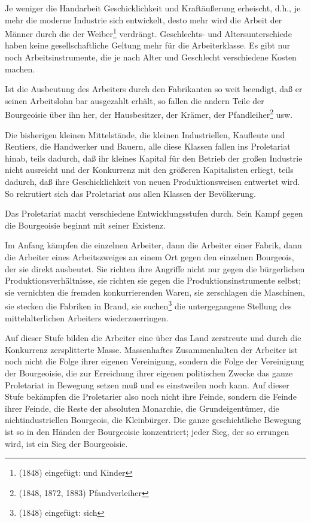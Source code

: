 \documentclass[letterpaper]{article}
\begin{document}
Je weniger die Handarbeit Geschicklichkeit und Kraftäußerung erheischt, d.h., je mehr die moderne Industrie sich entwickelt, desto mehr wird die Arbeit der Männer durch die der Weiber\footnote{(1848) eingefügt: und Kinder} verdrängt. Geschlechts- und Altersunterschiede haben keine gesellschaftliche Geltung mehr für die Arbeiterklasse. Es gibt nur noch Arbeitsinstrumente, die je nach Alter und Geschlecht verschiedene Kosten machen.

Ist die Ausbeutung des Arbeiters durch den Fabrikanten so weit beendigt, daß er seinen Arbeitslohn bar ausgezahlt erhält, so fallen die andern Teile der Bourgeoisie über ihn her, der Hausbesitzer, der Krämer, der Pfandleiher\footnote{(1848, 1872, 1883) Pfandverleiher} usw.

Die bisherigen kleinen Mittelstände, die kleinen Industriellen, Kaufleute und Rentiers, die Handwerker und Bauern, alle diese Klassen fallen ins Proletariat hinab, teils dadurch, daß ihr kleines Kapital für den Betrieb der großen Industrie nicht ausreicht und der Konkurrenz mit den größeren Kapitalisten erliegt, teils dadurch, daß ihre Geschicklichkeit von neuen Produktionsweisen entwertet wird. So rekrutiert sich das Proletariat aus allen Klassen der Bevölkerung.

Das Proletariat macht verschiedene Entwicklungsstufen durch. Sein Kampf gegen die Bourgeoisie beginnt mit seiner Existenz.

Im Anfang kämpfen die einzelnen Arbeiter, dann die Arbeiter einer Fabrik, dann die Arbeiter eines Arbeitszweiges an einem Ort gegen den einzelnen Bourgeois, der sie direkt ausbeutet. Sie richten ihre Angriffe nicht nur gegen die bürgerlichen Produktionsverhältnisse, sie richten sie gegen die Produktionsinstrumente selbst; sie vernichten die fremden konkurrierenden Waren, sie zerschlagen die Maschinen, sie stecken die Fabriken in Brand, sie suchen\footnote{(1848) eingefügt: sich} die untergegangene Stellung des mittelalterlichen Arbeiters wiederzuerringen.

Auf dieser Stufe bilden die Arbeiter eine über das Land zerstreute und durch die Konkurrenz zersplitterte Masse. Massenhaftes Zusammenhalten der Arbeiter ist noch nicht die Folge ihrer eigenen Vereinigung, sondern die Folge der Vereinigung der Bourgeoisie, die zur Erreichung ihrer eigenen politischen Zwecke das ganze Proletariat in Bewegung setzen muß und es einstweilen noch kann. Auf dieser Stufe bekämpfen die Proletarier also noch nicht ihre Feinde, sondern die Feinde ihrer Feinde, die Reste der absoluten Monarchie, die Grundeigentümer, die nichtindustriellen Bourgeois, die Kleinbürger. Die ganze geschichtliche Bewegung ist so in den Händen der Bourgeoisie konzentriert; jeder Sieg, der so errungen wird, ist ein Sieg der Bourgeoisie.
\end{document}
